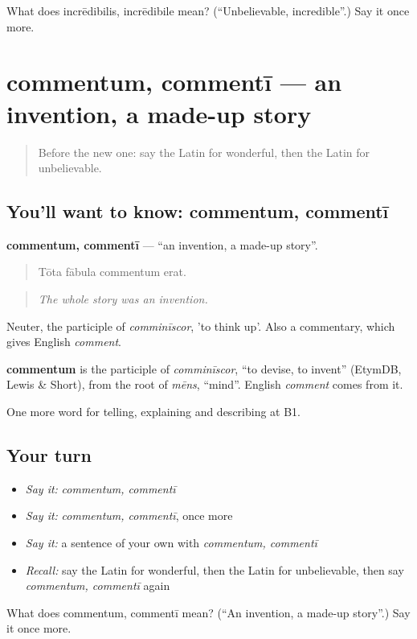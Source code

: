 \begin{tcolorbox}[breakable,colback=teal!4,colframe=teal!35!black,title={Before you move on}]
What does incrēdibilis, incrēdibile mean? (\textquotedblleft{}Unbelievable, incredible\textquotedblright{}.) Say it once more.
\end{tcolorbox}
\section[commentum, commentī]{commentum, commentī — an invention, a made-up story}

\label{lesson:LA-C349-commentum}



\begin{quote}
Before the new one: say the Latin for wonderful, then the Latin for unbelievable.
\end{quote}

\subsection*{You'll want to know: commentum, commentī}
\textbf{commentum, commentī} — \textquotedblleft{}an invention, a made-up story\textquotedblright{}.

\begin{quote}
Tōta fābula commentum erat.
\end{quote}

\begin{quote}
\emph{The whole story was an invention.}
\end{quote}

Neuter, the participle of \emph{comminīscor}, 'to think up'. Also a commentary, which gives English \emph{comment}.

\begin{cousinweb}
\textbf{commentum} is the participle of \emph{comminīscor}, \textquotedblleft{}to devise, to invent\textquotedblright{} (EtymDB, Lewis \& Short), from the root of \emph{mēns}, \textquotedblleft{}mind\textquotedblright{}. English \emph{comment} comes from it.
\end{cousinweb}

\begin{grammarlens}[title={What you've built}]
One more word for telling, explaining and describing at B1.
\end{grammarlens}

\subsection*{Your turn}
\begin{itemize}
\raggedright
  \item \emph{Say it:} \emph{commentum, commentī}
  \item \emph{Say it:} \emph{commentum, commentī}, once more
  \item \emph{Say it:} a sentence of your own with \emph{commentum, commentī}
  \item \emph{Recall:} say the Latin for wonderful, then the Latin for unbelievable, then say \emph{commentum, commentī} again
\end{itemize}

\begin{tcolorbox}[breakable,colback=teal!4,colframe=teal!35!black,title={Before you move on}]
What does commentum, commentī mean? (\textquotedblleft{}An invention, a made-up story\textquotedblright{}.) Say it once more.
\end{tcolorbox}
